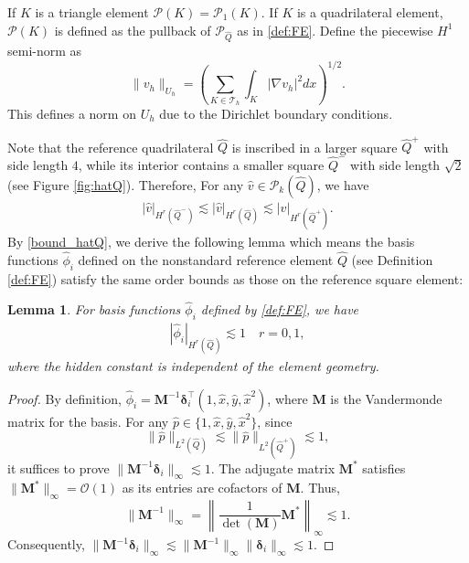 \documentclass[a4paper,11pt,fleqn]{article}
\newtheorem{lemma}[theorem]{Lemma}
\numberwithin{equation}{section}
\begin{document}
If $K$ is a triangle element $\mathcal{P}(K)=\mathcal{P}_1(K)$. If $K$ is a quadrilateral element, $\mathcal{P}(K)$ is defined as the pullback of $\mathcal{P}_{\hat{Q}}$ as in \eqref{def:FE}. Define the piecewise $H^1$ semi-norm as
\begin{equation}\label{eq:energy-norm}
	\| v_h \|_{U_h} = (\sum_{K \in \mathcal{T}_h} \int_K |\nabla v_h|^2  dx)^{1/2}.
\end{equation}
This defines a norm on $U_h$ due to the Dirichlet boundary conditions.

Note that the reference quadrilateral $\hat{Q}$ is inscribed in a larger square $\hat{Q}^+$ with side length $4$, while its interior contains a smaller square $\hat{Q}^-$ with side length $\sqrt{2}$ (see Figure \ref{fig:hatQ}). Therefore, For any $\hat{v} \in \mathcal{P}_k(\hat{Q})$, we have
\begin{equation}\label{bound_hatQ}
\begin{aligned}	
	|\hat{v}|_{H^r(\hat{Q}^-)} \lesssim |\hat{v}|_{H^r(\hat{Q})} \lesssim |\hat{v}|_{H^r(\hat{Q}^+)}.
\end{aligned}
\end{equation}
By \eqref{bound_hatQ}, we derive the following lemma which means the basis functions $\hat{\phi}_i$ defined on the nonstandard reference element $\hat{Q}$ (see Definition \ref{def:FE}) satisfy the same order bounds as those on the reference square element:
\begin{lemma}\label{lem:basis_bound}
	For basis functions $\hat{\phi}_i$ defined by \eqref{def:FE}, we have
	\begin{align}
		|\hat{\phi}_i|_{H^r(\hat{Q})} \lesssim 1\quad r =0,1, 
	\end{align} 
	where the hidden constant is independent of the element geometry.
\end{lemma}
\begin{proof}
	By definition, $\hat{\phi}_i = \bm{M}^{-1} \bm{\delta}_i^{\top} (1, \hat{x}, \hat{y}, \hat{x}^2)$, where $\bm{M}$ is the Vandermonde matrix for the basis. 
	For any $\hat{p}\in \{1, \hat{x}, \hat{y}, \hat{x}^2\}$, since
	\begin{equation*}
		\|\hat{p}\|_{L^2(\hat{Q})}\lesssim \|\hat{p}\|_{L^2(\hat{Q}^+)}\lesssim 1,
	\end{equation*}
	it suffices to prove $\|\bm{M}^{-1} \bm{\delta}_i\|_{\infty} \lesssim 1$. The adjugate matrix $\bm{M}^*$ satisfies $\|\bm{M}^*\|_{\infty} = \mathcal{O}(1)$ as its entries are cofactors of $\bm{M}$. Thus,
	\[
	\|\bm{M}^{-1}\|_{\infty} = \left\| \frac{1}{\det(\bm{M})}\bm{M}^* \right\|_{\infty} \lesssim 1.
	\]
	Consequently, $\|\bm{M}^{-1} \bm{\delta}_i\|_{\infty} \lesssim \|\bm{M}^{-1}\|_{\infty} \|\bm{\delta}_i\|_{\infty} \lesssim 1$.
\end{proof}
\end{document}
